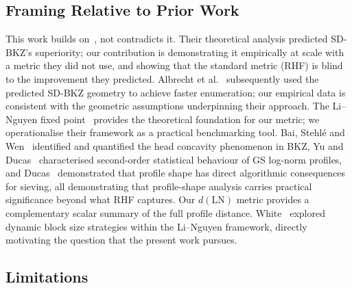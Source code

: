 \documentclass[journal=cic,version=preprint]{iacrj}
\begin{document}
\subsection{Framing Relative to Prior Work}

This work builds on~\cite{EC:MicWal16}, not contradicts it. Their theoretical analysis predicted SD-BKZ's superiority; our contribution is demonstrating it empirically at scale with a metric they did not use, and showing that the standard metric (RHF) is blind to the improvement they predicted. Albrecht et al.~\cite{C:ABFKSW20} subsequently used the predicted SD-BKZ geometry to achieve faster enumeration; our empirical data is consistent with the geometric assumptions underpinning their approach. The Li--Nguyen fixed point~\cite{EPRINT:LiNgu20} provides the theoretical foundation for our metric; we operationalise their framework as a practical benchmarking tool. Bai, Stehl\'{e} and Wen~\cite{AC:BaiSteWen18} identified and quantified the head concavity phenomenon in BKZ, Yu and Ducas~\cite{SAC:YuDuc17} characterised second-order statistical behaviour of GS log-norm profiles, and Ducas~\cite{EC:Ducas18} demonstrated that profile shape has direct algorithmic consequences for sieving, all demonstrating that profile-shape analysis carries practical significance beyond what RHF captures. Our $d(\mathrm{LN})$ metric provides a complementary scalar summary of the full profile distance. White~\cite{White26} explored dynamic block size strategies within the Li--Nguyen framework, directly motivating the question that the present work pursues.

\subsection{Limitations}
\label{sec:limitations}
\end{document}
